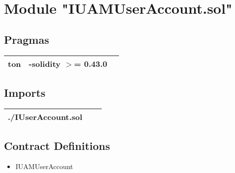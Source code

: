 
\section{Module "IUAMUserAccount.sol"}


\subsection{Pragmas}


\noindent\begin{tabular}{|l|l|p{5cm}|}\hline
ton & -solidity $>$= 0.43.0 &\\\hline
\end{tabular}


\subsection{Imports}


\noindent\begin{tabular}{|l|l|p{5cm}|}\hline
./IUserAccount.sol &\\\hline
\end{tabular}


\subsection{Contract Definitions}

\begin{itemize}
\item IUAMUserAccount
\end{itemize}
